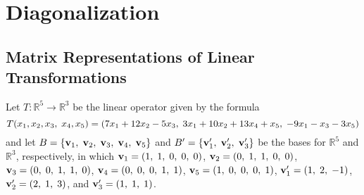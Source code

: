 
\chapter{Diagonalization}

\section{Matrix Representations of Linear Transformations}

\begin{exer}Let $T : \mathbb{R}^{5} \rightarrow \mathbb{R}^{3}$ be the linear operator given by the formula
$$T(x_{1}, x_{2}, x_{3}, \hspace{1mm} x_{4}, x_{5}) = (7x_{1}+12x_{2}-5x_{3}, \hspace{1mm} 3x_{1}+10x_{2}+13x_{4}+x_{5}, \hspace{1mm} -9x_{1}-x_{3}-3x_{5})$$
and let $B = \{\mathbf{v}_{1}, \hspace{1mm} \mathbf{v}_{2}, \hspace{1mm} \mathbf{v}_{3}, \hspace{1mm} \mathbf{v}_{4}, \hspace{1mm} \mathbf{v}_{5}\}$ and $B' = \{\mathbf{v}'_{1}, \hspace{1mm} \mathbf{v}'_{2}, \hspace{1mm} \mathbf{v}'_{3}\}$ be the bases for $\mathbb{R}^{5}$ and $\mathbb{R}^{3}$, respectively, in which $\mathbf{v}_{1} = (1, \hspace{1mm} 1, \hspace{1mm} 0, \hspace{1mm} 0, \hspace{1mm} 0)$, $\mathbf{v}_{2} = (0, \hspace{1mm} 1, \hspace{1mm} 1, \hspace{1mm} 0, \hspace{1mm} 0)$, $\mathbf{v}_{3} = (0, \hspace{1mm} 0, \hspace{1mm} 1, \hspace{1mm} 1, \hspace{1mm} 0)$, $\mathbf{v}_{4} = (0, \hspace{1mm} 0, \hspace{1mm} 0, \hspace{1mm} 1, \hspace{1mm} 1)$, $\mathbf{v}_{5} = (1, \hspace{1mm} 0, \hspace{1mm} 0, \hspace{1mm} 0, \hspace{1mm} 1)$, $\mathbf{v}'_{1} = (1, \hspace{1mm} 2, \hspace{1mm} -1)$, $\mathbf{v}'_{2} = (2, \hspace{1mm} 1, \hspace{1mm} 3)$, and $\mathbf{v}'_{3} = (1, \hspace{1mm} 1, \hspace{1mm} 1)$.


\end{exer}
